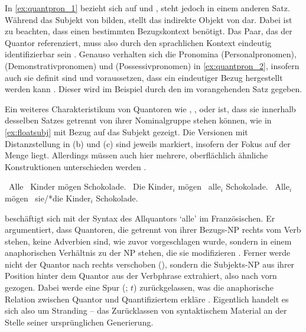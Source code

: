 In \cref{ex:quantpron_1} bezieht sich  auf  und ,
steht jedoch in einem anderen Satz. Während  das Subjekt
von  bilden, stellt  das indirekte Objekt von
 dar. Dabei ist zu beachten, dass  einen bestimmten
Bezugskontext benötigt. Das Paar, das der Quantor referenziert, muss also durch
den sprachlichen Kontext eindeutig identifizierbar sein
\autocites[vgl.~z.\,B.][274]{lyons1999}[788]{schwartz2000}[983]{janssen2004}.
Genauso verhalten sich die Pronomina  (Personalpronomen), 
(Demonstrativpronomen) und  (Possessivpronomen) in
\cref{ex:quantpron_2}, insofern auch sie definit sind und voraussetzen, dass
ein eindeutiger Bezug hergestellt werden kann
\autocites[vgl.][145--148]{lyons1999}. Dieser wird im Beispiel durch den
 im vorangehenden Satz gegeben.

Ein weiteres Charakteristikum von Quantoren wie ,
,  oder  ist, dass sie innerhalb desselben
Satzes getrennt von ihrer Nominalgruppe stehen können, wie in
\cref{ex:floatsubj} mit Bezug auf das Subjekt gezeigt. Die Versionen mit
Distanzstellung in (b) und (c) sind jeweils markiert, insofern der Fokus auf
der Menge liegt. Allerdings müssen auch hier mehrere, oberflächlich ähnliche
Konstruktionen unterschieden werden
\autocites[27--28]{pittner1995}[65--67]{fanselowcavar2002}.

\begin{exe}
\ex \label{ex:floatsubj}
\begin{xlist}
	\ex \label{ex:floatsubj_1}
		{\ob}~Alle {\ob}~Kinder{\cb}{\cb} mögen Schokolade.
	\ex \label{ex:floatsubj_2}
		{\ob}~Die Kinder{\cb}$_i$ mögen {\ob}~alle{\cb}$_i$
		Schokolade.
	\ex \label{ex:floatsubj_3}
		{\ob}~Alle{\cb}$_i$ mögen {\ob}~sie/*die
		Kinder{\cb}$_i$ Schokolade.
\end{xlist}
\end{exe}

\citet{sportiche1988} beschäftigt sich mit der Syntax des Allquantors 
`alle' im Französischen. Er argumentiert, dass Quantoren, die getrennt von
ihrer Bezugs-NP rechts vom Verb stehen, keine Adverbien sind, wie zuvor
vorgeschlagen wurde, sondern in einem anaphorischen Verhältnis zu der NP
stehen, die sie modifizieren \autocite[428--433]{sportiche1988}. Ferner werde
nicht der Quantor nach rechts verschoben (), sondern die
Subjekts-NP aus ihrer Position hinter dem Quantor aus der Verbphrase
extrahiert, also nach vorn gezogen. Dabei werde eine Spur (; $t$)
zurückgelassen, was die anaphorische Relation zwischen Quantor und
Quantifiziertem erkläre \autocite[432--433]{sportiche1988}. Eigentlich handelt
es sich also um Stranding -- das Zurücklassen von syntaktischem Material an der
Stelle seiner ursprünglichen Generierung.

